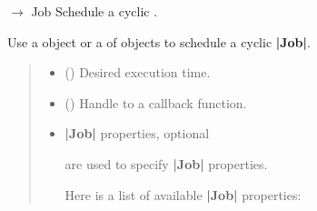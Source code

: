\documentclass[letterpaper,10pt,english]{sphinxmanual}
\begin{document}
\begin{fulllineitems}
\begin{quote}
\begin{description}
\end{description}\end{quote}

\begin{fulllineitems}
\label{\detokenize{index:scheduler.Scheduler.cyclic}}
\pysigstartsignatures
\pysiglinewithargsret
{}
{\sphinxparamcomma {}\sphinxparamcomma {}}
{{ $\rightarrow$ Job}}
\pysigstopsignatures
\sphinxAtStartPar
Schedule a cyclic .

\sphinxAtStartPar
Use a  object or a  of  objects
to schedule a cyclic {\color{red}\bfseries{}|Job|}.
\begin{quote}\begin{description}
\begin{itemize}
\item {} 
\sphinxAtStartPar
{} () \textendash{} Desired execution time.

\item {} 
\sphinxAtStartPar
{} (\sphinxstyleliteralemphasis{\sphinxupquote{{[}}}\sphinxstyleliteralemphasis{\sphinxupquote{, }}\sphinxstyleliteralemphasis{\sphinxupquote{{]}}}) \textendash{} Handle to a callback function.

\item {} 
\sphinxAtStartPar
{} \textendash{} 
\sphinxAtStartPar
{\color{red}\bfseries{}|Job|} properties, optional

\sphinxAtStartPar
{} are used to specify {\color{red}\bfseries{}|Job|} properties.

\sphinxAtStartPar
Here is a list of available {\color{red}\bfseries{}|Job|} properties:



\end{itemize}
\end{description}
\end{quote}
\end{fulllineitems}
\end{fulllineitems}
\end{document}
